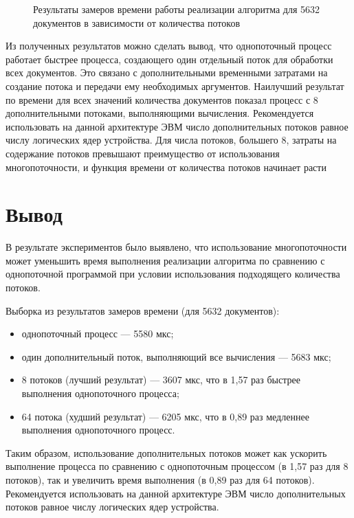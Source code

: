 \clearpage

\begin{figure}[h!]
	\centering
	\caption{Результаты замеров времени работы реализации алгоритма для 5632 документов в зависимости от количества потоков}
	\label{img:g2}
\end{figure}

Из полученных результатов можно сделать вывод, что однопоточный процесс работает быстрее процесса, создающего один отдельный поток для обработки всех документов. Это связано с дополнительными временными затратами на создание потока и передачи ему необходимых аргументов.
Наилучший результат по времени для всех значений количества документов показал процесс с 8 дополнительными потоками, выполняющими вычисления. Рекомендуется использовать на данной архитектуре ЭВМ число дополнительных потоков равное числу логических ядер устройства.
Для числа потоков, большего 8, затраты на содержание потоков превышают преимущество от использования многопоточности, и функция времени от количества потоков начинает расти

\section{Вывод}
В результате экспериментов было выявлено, что использование многопоточности может уменьшить время выполнения реализации алгоритма по сравнению с однопоточной программой при условии использования подходящего количества потоков.

Выборка из результатов замеров времени (для 5632 документов):
\begin{itemize}
	\item однопоточный процесс --- 5580 мкс;
	\item один дополнительный поток, выполняющий все вычисления --- 5683 мкс;
	\item 8 потоков (лучший результат) — 3607 мкс, что в 1,57 раз быстрее выполнения однопоточного процесса;
	\item 64 потока (худший результат) — 6205 мкс, что в 0,89 раз медленнее выполнения однопоточного процесс.
\end{itemize}

Таким образом, использование дополнительных потоков может как ускорить выполнение процесса по сравнению с однопоточным процессом (в 1,57 раз для 8 потоков), так и увеличить время выполнения (в 0,89 раз для 64 потоков).
Рекомендуется использовать на данной архитектуре ЭВМ число дополнительных потоков равное числу логических ядер устройства.